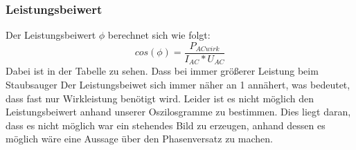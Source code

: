 \subsubsection{Leistungsbeiwert}
Der Leistungsbeiwert $ \phi $ berechnet sich wie folgt:
%
\begin{equation}
	cos(\phi)=\frac{ P_{ ACwirk } }{  I_{ AC }*U_{AC }}
\end{equation}
%
Dabei ist in der Tabelle zu sehen. Dass bei immer größerer Leistung beim Staubsauger Der Leistungsbeiwet sich immer näher an 1 annähert, was bedeutet, dass fast nur Wirkleistung benötigt wird. Leider ist es nicht möglich den Leistungsbeiwert anhand unserer Oszilosgramme zu bestimmen. Dies liegt daran, dass es nicht möglich war ein stehendes Bild zu erzeugen, anhand dessen es möglich wäre eine Aussage über den Phasenversatz zu machen.